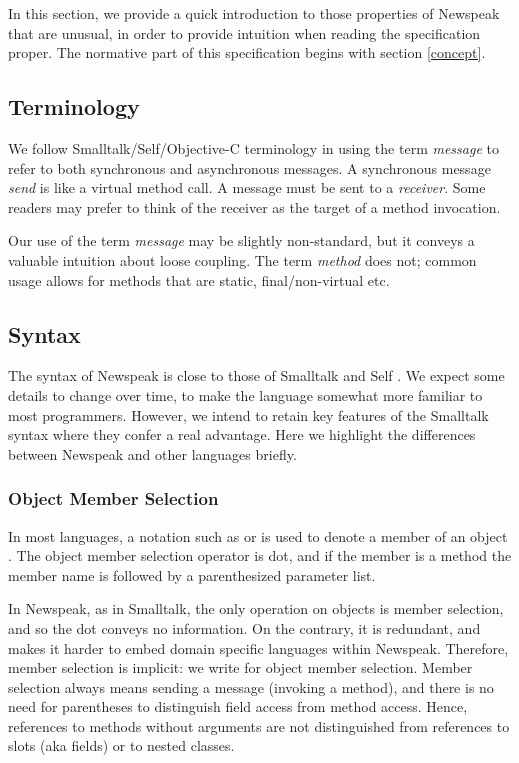 \documentclass{article}
\begin{document}
In this section, we provide a quick introduction to those properties of Newspeak that are unusual, in
order to provide intuition when reading the specification proper. The normative part of this specification  begins with section \ref{concept}. 

\subsection{Terminology}

We follow Smalltalk/Self/Objective-C terminology in using the term {\em message} to refer to both synchronous and asynchronous messages. A synchronous message {\em send} is like a virtual method call.
A message must be sent to a {\em receiver}. Some readers may prefer to think of the receiver as the target of a method invocation.  

Our use of the term {\em message} may be slightly non-standard, but it conveys a valuable intuition about loose coupling. The term {\em method} does not; common usage allows for methods that are static, final/non-virtual etc.

\subsection{Syntax}

The syntax of Newspeak is close to those of Smalltalk and Self \cite{UngarSmith87}. We expect some details to change over time, to make the language somewhat more familiar to most programmers. However, we intend to retain key features of the Smalltalk syntax where they confer a real advantage. Here we highlight the differences between Newspeak and other languages briefly.

\subsubsection{Object Member Selection}

In most languages, a notation such as   or  is used to denote a member  of an object . The object member selection operator is dot, and if the member is a method the member name is followed by a parenthesized parameter list. 

In Newspeak, as in Smalltalk, the only operation on objects is member selection, and so the dot conveys no information. On the contrary, it is redundant, and makes it harder to embed domain specific languages within Newspeak. Therefore, member selection is implicit: we write  for object member selection. Member selection always means sending
a message (invoking a method), and there is no need for parentheses to distinguish field access from
method access. Hence, references to methods without arguments are not distinguished from references to slots (aka fields) or to nested classes.
\end{document}
